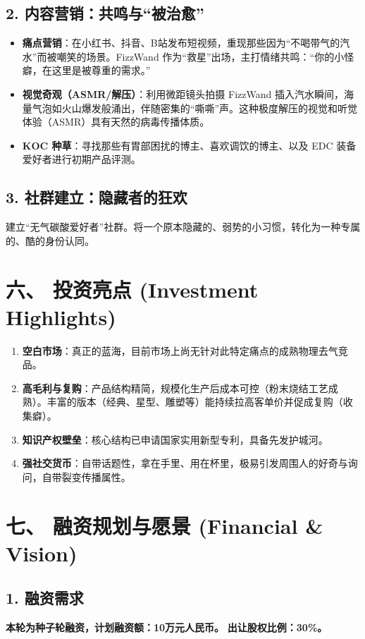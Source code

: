 \documentclass[a4paper,12pt]{ctexart}
\begin{document}
\subsection{2. 内容营销：共鸣与“被治愈”}
\begin{itemize}
    \item \textbf{痛点营销}：在小红书、抖音、B站发布短视频，重现那些因为“不喝带气的汽水”而被嘲笑的场景。FizzWand 作为“救星”出场，主打情绪共鸣：“你的小怪癖，在这里是被尊重的需求。”
    \item \textbf{视觉奇观（ASMR/解压）}：利用微距镜头拍摄 FizzWand 插入汽水瞬间，海量气泡如火山爆发般涌出，伴随密集的“嘶嘶”声。这种极度解压的视觉和听觉体验（ASMR）具有天然的病毒传播体质。
    \item \textbf{KOC 种草}：寻找那些有胃部困扰的博主、喜欢调饮的博主、以及 EDC 装备爱好者进行初期产品评测。
\end{itemize}

\subsection{3. 社群建立：隐藏者的狂欢}
建立“无气碳酸爱好者”社群。将一个原本隐藏的、弱势的小习惯，转化为一种专属的、酷的身份认同。

\section{六、 投资亮点 (Investment Highlights)}
\begin{enumerate}
    \item \textbf{空白市场}：真正的蓝海，目前市场上尚无针对此特定痛点的成熟物理去气竞品。
    \item \textbf{高毛利与复购}：产品结构精简，规模化生产后成本可控（粉末烧结工艺成熟）。丰富的版本（经典、星型、雕塑等）能持续拉高客单价并促成复购（收集癖）。
    \item \textbf{知识产权壁垒}：核心结构已申请国家实用新型专利，具备先发护城河。
    \item \textbf{强社交货币}：自带话题性，拿在手里、用在杯里，极易引发周围人的好奇与询问，自带裂变传播属性。
\end{enumerate}

\section{七、 融资规划与愿景 (Financial \& Vision)}
\subsection{1. 融资需求}
\textbf{本轮为种子轮融资，计划融资额：10万元人民币。}
\textbf{出让股权比例：30\%。}
\end{document}
